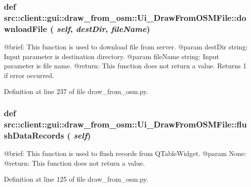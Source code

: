 \hypertarget{classsrc_1_1client_1_1gui_1_1draw__from__osm_1_1Ui__DrawFromOSMFile_a6975a594bec41cbd81f5000b4f502897}{
\subsubsection[{downloadFile}]{\setlength{\rightskip}{0pt plus 5cm}def src::client::gui::draw\_\-from\_\-osm::Ui\_\-DrawFromOSMFile::downloadFile ( {\em self}, \/   {\em destDir}, \/   {\em fileName})}}
\label{classsrc_1_1client_1_1gui_1_1draw__from__osm_1_1Ui__DrawFromOSMFile_a6975a594bec41cbd81f5000b4f502897}
\begin{DoxyVerb}
@brief: This function is used to download file from server.
@param destDir string: Input parameter is destination directory.
@param fileName string: Input parameter is file name. 
@return: This function does not return a value. Returns 1 if error occurred.
\end{DoxyVerb}
 

Definition at line 237 of file draw\_\-from\_\-osm.py.

\hypertarget{classsrc_1_1client_1_1gui_1_1draw__from__osm_1_1Ui__DrawFromOSMFile_add4b2bf9525274304427977b36b65653}{
\subsubsection[{flushDataRecords}]{\setlength{\rightskip}{0pt plus 5cm}def src::client::gui::draw\_\-from\_\-osm::Ui\_\-DrawFromOSMFile::flushDataRecords ( {\em self})}}
\label{classsrc_1_1client_1_1gui_1_1draw__from__osm_1_1Ui__DrawFromOSMFile_add4b2bf9525274304427977b36b65653}
\begin{DoxyVerb}
@brief: This function is used to flush records from QTableWidget.
@param None:
@return: This function does not return a value.
\end{DoxyVerb}
 

Definition at line 125 of file draw\_\-from\_\-osm.py.

